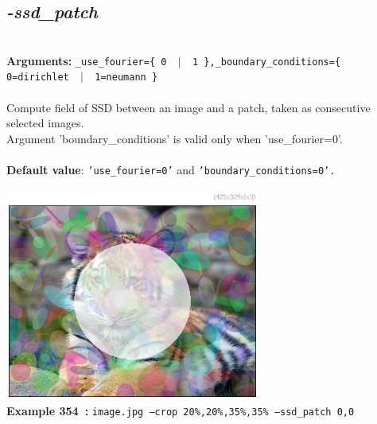 \documentclass[a4paper,11pt,twoside]{book}
\begin{document}
\subsection{\emph{-ssd\_patch} }\vspace*{-0.5em}
~\\\textbf{Arguments: } 
{\small \texttt{\_use\_fourier=\{ 0 ~$|$~ 1 \},\_boundary\_conditions=\{ 0=dirichlet ~$|$~ 1=neumann \}}}\\~\\
Compute field of SSD between an image and a patch, taken as consecutive selected images.
~\\Argument 'boundary\_conditions' is valid only when 'use\_fourier=0'.
~\\~\\\textbf{Default value}: {\small \texttt{'use\_fourier=0'} and \texttt{'boundary\_conditions=0'.}}
\begin{center}\includegraphics[keepaspectratio=true,height=7cm,width=\textwidth]{img/gmic_def354.jpg}\\
{\footnotesize \textbf{Example 354~:} \texttt{image.jpg --crop 20\%,20\%,35\%,35\% --ssd\_patch 0,0}}
\end{center}
\end{document}
